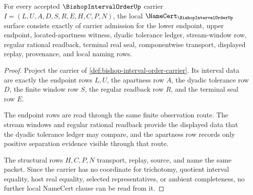 \begin{theorem}
\label{thm:bishop-interval-order-namecert-obligations}
For every accepted $\BishopIntervalOrderUp$ carrier $I=(L,U,A,D,S,R,E,H,C,P,N)$, the local $\NameCert_{\BishopIntervalOrderUp}$ surface consists exactly of carrier admission for the lower endpoint, upper endpoint, located-apartness witness, dyadic tolerance ledger, stream-window row, regular rational readback, terminal real seal, componentwise transport, displayed replay, provenance, and local naming rows.
\end{theorem}
\begin{proof}
Project the carrier of \autoref{def:bishop-interval-order-carrier}. Its interval data are exactly the endpoint rows $L,U$, the apartness row $A$, the dyadic tolerance row $D$, the finite window row $S$, the regular readback row $R$, and the terminal seal row $E$.

The endpoint rows are read through the same finite observation route. The stream windows and regular rational readback provide the displayed data that the dyadic tolerance ledger may compare, and the apartness row records only positive separation evidence visible through that route.

The structural rows $H,C,P,N$ transport, replay, source, and name the same packet. Since the carrier has no coordinate for trichotomy, quotient interval equality, host real equality, selected representatives, or ambient completeness, no further local NameCert clause can be read from it.
\end{proof}

